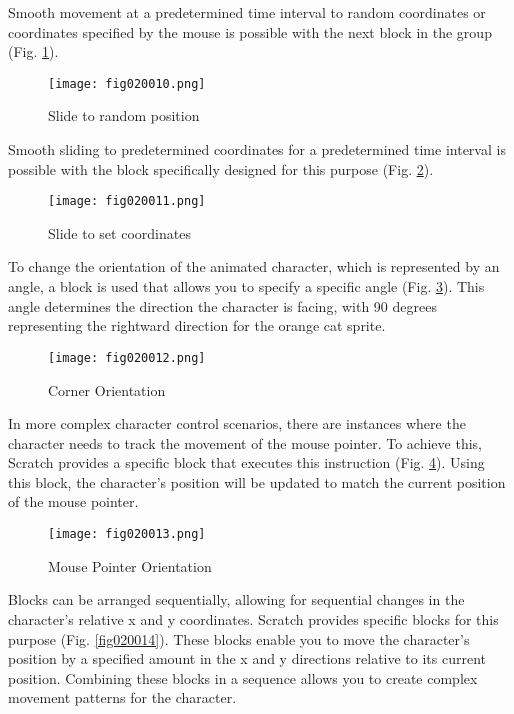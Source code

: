 Smooth movement at a predetermined time interval to random coordinates or coordinates specified by the mouse is possible with the next block in the group (Fig. \ref{fig020010}).

\begin{figure}[H]
   \centering
   \texttt{[image: fig020010.png]}
   \caption{Slide to random position}
\label{fig020010}
\end{figure}

Smooth sliding to predetermined coordinates for a predetermined time interval is possible with the block specifically designed for this purpose (Fig. \ref{fig020011}).

\begin{figure}[H]
   \centering
   \texttt{[image: fig020011.png]}
   \caption{Slide to set coordinates}
\label{fig020011}
\end{figure}

To change the orientation of the animated character, which is represented by an angle, a block is used that allows you to specify a specific angle (Fig. \ref{fig020012}). This angle determines the direction the character is facing, with 90 degrees representing the rightward direction for the orange cat sprite.

\begin{figure}[H]
   \centering
   \texttt{[image: fig020012.png]}
   \caption{Corner Orientation}
\label{fig020012}
\end{figure}

In more complex character control scenarios, there are instances where the character needs to track the movement of the mouse pointer. To achieve this, Scratch provides a specific block that executes this instruction (Fig. \ref{fig020013}). Using this block, the character's position will be updated to match the current position of the mouse pointer.

\begin{figure}[H]
   \centering
   \texttt{[image: fig020013.png]}
   \caption{Mouse Pointer Orientation}
\label{fig020013}
\end{figure}

Blocks can be arranged sequentially, allowing for sequential changes in the character's relative x and y coordinates. Scratch provides specific blocks for this purpose (Fig. \ref{fig020014}). These blocks enable you to move the character's position by a specified amount in the x and y directions relative to its current position. Combining these blocks in a sequence allows you to create complex movement patterns for the character.

